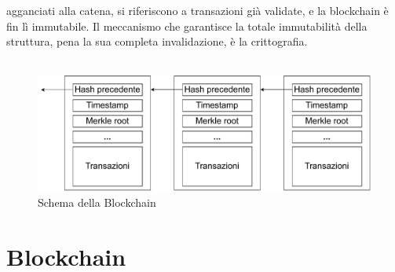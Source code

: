 agganciati alla catena, si riferiscono a transazioni già validate, e la blockchain è fin lì immutabile. Il meccanismo che garantisce la totale immutabilità della struttura, pena la sua completa invalidazione, è la crittografia.\\\\
\begin{figure}[h!]
    \centering
    \includegraphics[scale=0.6]{Images/blockChaining.pdf}
    \caption{Schema della Blockchain}
    \label{fig:blockchain}
\end{figure}
\FloatBarrier
\section{Blockchain}

